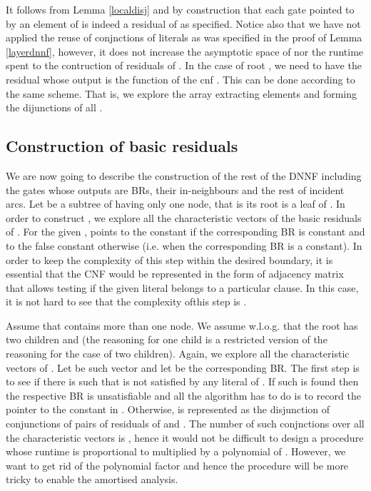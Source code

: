 \documentclass{llncs}
\begin{document}
It follows from Lemma \ref{localdisj} and by construction that each gate pointed to by an element of
 is indeed a residual of  as specified. Notice also that we have not applied the reuse of
conjnctions of literals as was specified in the proof of Lemma \ref{layerdnnf}, however, it does not
increase the asymptotic space of  nor the runtime  spent to the contruction of residuals
of . In the case of root , we need to have the residual  whose
output is the function of the {\sc cnf} . This can be done according to the same scheme.
That is, we explore the array  extracting elements  and forming the dijunctions
of all .

\subsection{Construction of basic residuals}
We are now going to describe the construction of the rest of the DNNF including the gates whose outputs
are BRs, their in-neighbours and the rest of incident arcs. Let  be a subtree of  having only one
node, that is its root is a leaf of . In order to construct , we explore all the characteristic
vectors  of the basic residuals of . For the given ,  points to the  constant
if the corresponding BR is  constant and to the false constant otherwise (i.e. when the corresponding
BR is a  constant). In order to keep the complexity of this step within the desired boundary, it is
essential that the CNF would be represented in the form of adjacency matrix that allows  testing
if the given literal belongs to a particular clause. In this case, it is not hard to see that the complexity
ofthis step is . 

Assume that  contains more than one node. We assume w.l.o.g. that the root  has two children
 and  (the reasoning for one child is a restricted version of the reasoning for the case of
two children). Again, we explore all the characteristic vectors of . Let  be such vector and
let  be the corresponding BR. The first step is to see if there is 
such that  is not satisfied by any literal of . If such  is found then the respective BR is unsatisfiable
and all the algorithm has to do is to record the pointer to the  constant in .
Otherwise,  is represented as the disjunction of conjunctions of pairs of residuals of  and .
The number of such conjnctions over all the characteristic vectors is , hence it would not be difficult to
design a procedure whose runtime is proportional to  multiplied by a polynomial of . However, we want
to get rid of the polynomial factor and hence the procedure will be more tricky to enable the amortised analysis.
\end{document}
